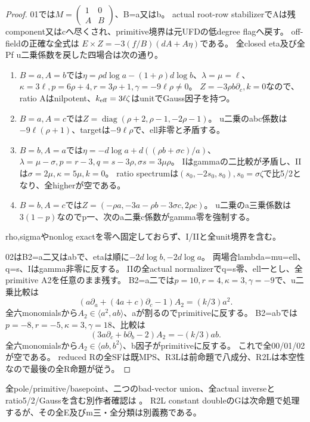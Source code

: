 \documentclass[a4paper,11pt]{ltjsarticle}
\theoremstyle{definition}
\begin{document}
\begin{proof}
01では$M=\left(\begin{smallmatrix}1&0\\A&B\end{smallmatrix}\right)$、B=a又はb。
actual root-row stabilizerでAは残component又はcへ尽くされ、primitive境界は元UFDの低degree flagへ戻す。
off-fieldの正確な全式は
$E\times Z=-3(f/B)(dA+A\eta)$である。
全closed eta及び全Pf u二乗係数を戻した四場合は次の通り。
\begin{enumerate}
\item $B=a,A=b$では$\eta=\rho d\log a-(1+\rho)d\log b$、$\lambda=\mu=\ell$、
 $\kappa=3\ell,p=6\rho+4,r=3\rho+1,\gamma=-9\ell\rho\ne0$。
 $Z=-3\rho b\partial_c,k=0$なので、ratio Aはnilpotent、$k_{\rm eff}=3\ell\zeta$はunitでGauss因子を持つ。
\item $B=a,A=c$では$Z=\operatorname{diag}(\rho+2,\rho-1,-2\rho-1)$。
 u二乗のabc係数は$-9\ell(\rho+1)$、targetは$-9\ell\rho$で、ell非零と矛盾する。
\item $B=b,A=a$では$\eta=-d\log a+d((\rho b+\sigma c)/a)$、
 $\lambda=\mu-\sigma,p=r-3,q=s-3\rho,\sigma s=3\mu\rho$。
 Iはgammaの二比較が矛盾し、IIは$\sigma=2\mu,\kappa=5\mu,k=0$。
 ratio spectrumは$(s_0,-2s_0,s_0),s_0=\sigma\zeta$で比5/2となり、全higherが空である。
\item $B=b,A=c$では$Z=(-\rho a,-3a-\rho b-3\sigma c,2\rho c)$。
 u二乗のa三乗係数は$3(1-p)$なのでp一、次のa二乗c係数がgamma零を強制する。
\end{enumerate}
rho,sigmaやnonlog exactを零へ固定しておらず、I/IIと全unit境界を含む。

02はB2=a二又はabで、etaは順に$-2d\log b,-2d\log a$。
両場合lambda=mu=ell、q=s、Iはgamma非零に反する。
IIの全actual normalizerでq=s零、ell一とし、全primitive A2を任意のまま残す。
B2=a二では$p=10,r=4,\kappa=3,\gamma=-9$で、u二乗比較は
\[
 (a\partial_a+(4a+c)\partial_c-1)A_2=(k/3)a^2.
\]
全六monomialsから$A_2\in\langle a^2,ab\rangle$、aが割るのでprimitiveに反する。
B2=abでは$p=-8,r=-5,\kappa=3,\gamma=18$、比較は
\[
 (3a\partial_c+b\partial_b-2)A_2=-(k/3)ab.
\]
全六monomialsから$A_2\in\langle ab,b^2\rangle$、b因子がprimitiveに反する。
これで全00/01/02が空である。
reduced Rの全SFは既MPS、R3Lは前命題で八成分、R2Lは本空性なので最後の全R命題が従う。
\end{proof}
全pole/primitive/basepoint、二つのbad-vector union、全actual inverseとratio5/2/Gaussを含む別作者確認は
。
R2L constant doubleのGは次命題で処理するが、その全E及びm三・全分類は別義務である。
\end{document}

